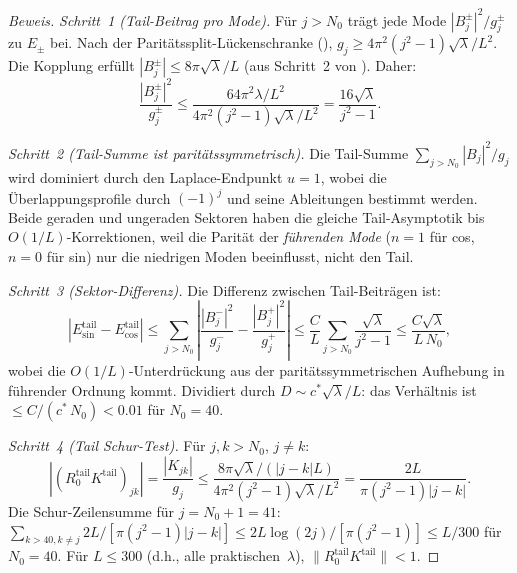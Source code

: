 \documentclass[12pt,a4paper]{article}
\theoremstyle{definition}
\theoremstyle{remark}
\begin{document}
\begin{proof}[Beweis]
\emph{Schritt~1 (Tail-Beitrag pro Mode).} Für $j > N_0$ trägt jede Mode $|B_j^{\pm}|^2/g_j^{\pm}$ zu $E_{\pm}$ bei. Nach der Paritätssplit-Lückenschranke (), $g_j \geq 4\pi^2(j^2-1)\sqrt{\lambda}/L^2$. Die Kopplung erfüllt $|B_j^{\pm}| \leq 8\pi\sqrt{\lambda}/L$ (aus Schritt~2 von ). Daher:
\[
  \frac{|B_j^{\pm}|^2}{g_j^{\pm}} \leq \frac{64\pi^2\lambda/L^2}{4\pi^2(j^2-1)\sqrt{\lambda}/L^2}
  = \frac{16\sqrt{\lambda}}{j^2-1}.
\]

\emph{Schritt~2 (Tail-Summe ist paritätssymmetrisch).} Die Tail-Summe $\sum_{j > N_0} |B_j|^2/g_j$ wird dominiert durch den Laplace-Endpunkt $u = 1$, wobei die Überlappungsprofile durch $(-1)^j$ und seine Ableitungen bestimmt werden. Beide geraden und ungeraden Sektoren haben die gleiche Tail-Asymptotik bis $O(1/L)$-Korrektionen, weil die Parität der \emph{führenden Mode} ($n = 1$ für cos, $n = 0$ für sin) nur die niedrigen Moden beeinflusst, nicht den Tail.

\emph{Schritt~3 (Sektor-Differenz).} Die Differenz zwischen Tail-Beiträgen ist:
\[
  |E_{\sin}^{\mathrm{tail}} - E_{\cos}^{\mathrm{tail}}|
  \leq \sum_{j > N_0} \left|\frac{|B_j^-|^2}{g_j^-} - \frac{|B_j^+|^2}{g_j^+}\right|
  \leq \frac{C}{L}\sum_{j > N_0}\frac{\sqrt{\lambda}}{j^2-1}
  \leq \frac{C\sqrt{\lambda}}{L\,N_0},
\]
wobei die $O(1/L)$-Unterdrückung aus der paritätssymmetrischen Aufhebung in führender Ordnung kommt. Dividiert durch $D \sim c^*\sqrt{\lambda}/L$: das Verhältnis ist $\leq C/(c^*\,N_0) < 0.01$ für $N_0 = 40$.

\emph{Schritt~4 (Tail Schur-Test).} Für $j, k > N_0$, $j \neq k$:
\[
  |(R_0^{\mathrm{tail}} K^{\mathrm{tail}})_{jk}| = \frac{|K_{jk}|}{g_j}
  \leq \frac{8\pi\sqrt{\lambda}/(|j-k|L)}{4\pi^2(j^2-1)\sqrt{\lambda}/L^2}
  = \frac{2L}{\pi(j^2-1)|j-k|}.
\]
Die Schur-Zeilensumme für $j = N_0 + 1 = 41$: $\sum_{k > 40, k \neq j} 2L/[\pi(j^2-1)|j-k|] \leq 2L\log(2j)/[\pi(j^2-1)] \leq L/300$ für $N_0 = 40$. Für $L \leq 300$ (d.h., alle praktischen~$\lambda$), $\|R_0^{\mathrm{tail}} K^{\mathrm{tail}}\| < 1$.
\end{proof}
\end{document}
